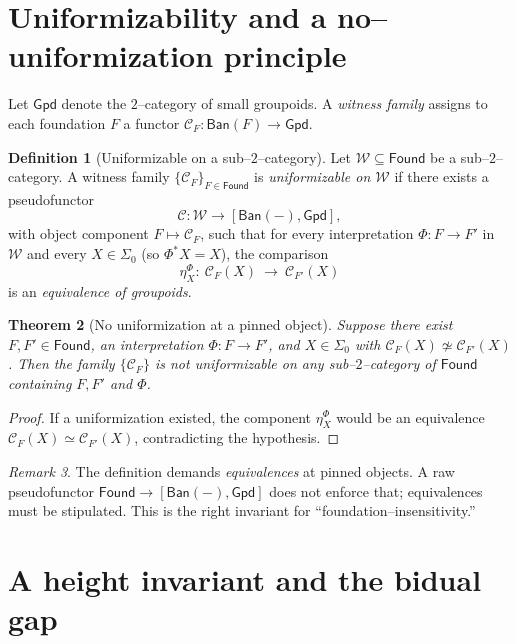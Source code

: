 \documentclass[11pt]{article}
\newtheorem{theorem}{Theorem}[section]
\theoremstyle{definition}
\newtheorem{definition}[theorem]{Definition}
\theoremstyle{remark}
\newtheorem{remark}[theorem]{Remark}
\newcommand{\Found}{\mathsf{Found}}
\newcommand{\Ban}{\mathsf{Ban}}
\newcommand{\Gpd}{\mathsf{Gpd}}
\newcommand{\SigmaZero}{\Sigma_{0}}
\begin{document}
\section{Uniformizability and a no--uniformization principle}\label{sec:uniform}

Let \(\Gpd\) denote the $2$--category of small groupoids. A \emph{witness family} assigns to each foundation \(F\) a functor \(\mathcal C_F:\Ban(F)\to\Gpd\).

\begin{definition}[Uniformizable on a sub--$2$--category]
Let \(\mathcal W\subseteq\Found\) be a sub--$2$--category. A witness family \(\{\mathcal C_F\}_{F\in\Found}\) is \emph{uniformizable on \(\mathcal W\)} if there exists a pseudofunctor
\[
  \mathcal C:\mathcal W \longrightarrow [\Ban(-),\Gpd],
\]
with object component \(F\mapsto \mathcal C_F\), such that for every interpretation \(\Phi:F\to F'\) in \(\mathcal W\) and every \(X\in\SigmaZero\) (so \(\Phi^*X=X\)), the comparison
\[
  \eta^\Phi_X:\ \mathcal C_F(X)\ \longrightarrow\ \mathcal C_{F'}(X)
\]
is an \emph{equivalence of groupoids}.
\end{definition}

\begin{theorem}[No uniformization at a pinned object]\label{thm:no-unif}
Suppose there exist \(F,F'\in\Found\), an interpretation \(\Phi:F\to F'\), and \(X\in\SigmaZero\) with
\(\mathcal C_F(X)\not\simeq\mathcal C_{F'}(X)\).
Then the family \(\{\mathcal C_F\}\) is not uniformizable on any sub--$2$--category of \(\Found\) containing \(F,F'\) and \(\Phi\).
\end{theorem}

\begin{proof}
If a uniformization existed, the component \(\eta^\Phi_X\) would be an equivalence
\(\mathcal C_F(X)\simeq\mathcal C_{F'}(X)\), contradicting the hypothesis.
\end{proof}

\begin{remark}
The definition demands \emph{equivalences} at pinned objects. A raw pseudofunctor \(\Found\to[\Ban(-),\Gpd]\) does not enforce that; equivalences must be stipulated. This is the right invariant for “foundation--insensitivity.”
\end{remark}

\section{A height invariant and the bidual gap}\label{sec:height}
\end{document}
